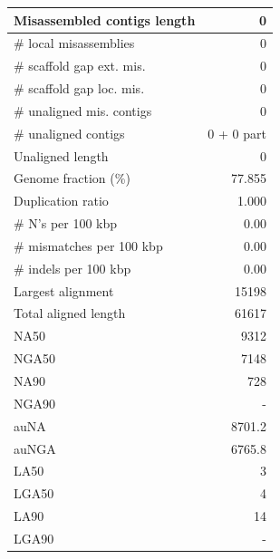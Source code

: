 \documentclass[12pt,a4paper]{article}
\begin{document}
\begin{table}[ht]
\begin{center}
\begin{tabular}{|l*{1}{|r}|}
Misassembled contigs length & 0 \\ \hline
\# local misassemblies & 0 \\ \hline
\# scaffold gap ext. mis. & 0 \\ \hline
\# scaffold gap loc. mis. & 0 \\ \hline
\# unaligned mis. contigs & 0 \\ \hline
\# unaligned contigs & 0 + 0 part \\ \hline
Unaligned length & 0 \\ \hline
Genome fraction (\%) & 77.855 \\ \hline
Duplication ratio & 1.000 \\ \hline
\# N's per 100 kbp & 0.00 \\ \hline
\# mismatches per 100 kbp & 0.00 \\ \hline
\# indels per 100 kbp & 0.00 \\ \hline
Largest alignment & 15198 \\ \hline
Total aligned length & 61617 \\ \hline
NA50 & 9312 \\ \hline
NGA50 & 7148 \\ \hline
NA90 & 728 \\ \hline
NGA90 & - \\ \hline
auNA & 8701.2 \\ \hline
auNGA & 6765.8 \\ \hline
LA50 & 3 \\ \hline
LGA50 & 4 \\ \hline
LA90 & 14 \\ \hline
LGA90 & - \\ \hline
\end{tabular}
\end{center}
\end{table}
\end{document}
